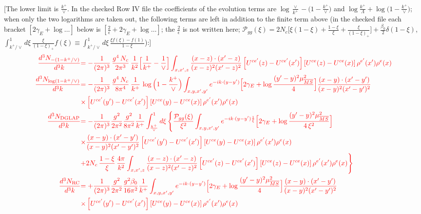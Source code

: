 \documentclass[9pt]{article}
\numberwithin{equation}{section}
\begin{document}
\begin{align}
\end{align} {\color{red}[The lower limit is $\frac{k^{+}}{\vee}$. In the checked Row IV file the coefficients of the evolution terms are $\log\frac{\vee}{k^{+}}-\big(1-\frac{k^{+}}{\vee}\big)$ and $\log\frac{k^{+}}{\Lambda}+\log\big(1-\frac{k^{+}}{\vee}\big)$; when only the two logarithms are taken out, the following terms are left in addition to the finite term above (in the checked file each bracket $[2\gamma_{E}+\log\dots]$ below is $[\frac{2}{\epsilon}+2\gamma_{E}+\log\dots]$; the $\frac{2}{\epsilon}$ is not written here; $\mathcal P_{gg}(\xi)=2N_{c}\big[\xi(1-\xi)+\frac{1-\xi}{\xi}+\frac{\xi}{(1-\xi)_{+}}\big]+\frac{\beta_{0}}{2}\delta(1-\xi)$, $\int_{k^{+}/\vee}^{1}d\xi\,\frac{\xi}{(1-\xi)_{+}}f(\xi)\equiv\int_{k^{+}/\vee}^{1}d\xi\,\frac{\xi f(\xi)-f(1)}{1-\xi}$):]} \begin{align} {\color{red}\frac{d^{3}N_{-(1-k^{+}/\vee)}}{d^{3}k}} & {\color{red}= -\frac{1}{(2\pi)^{3}}\,\frac{g^{4}\,N_{c}}{2\pi^{3}}\,\frac{1}{k^{2}}\Big[\frac{1}{k^{+}}-\frac{1}{\vee}\Big]\int_{x,x',z}\frac{(x-z)\cdot(x'-z)}{(x-z)^{2}(x'-z)^{2}}\left[U^{ce'}(z) - U^{ce'}(x')\right]\left[U^{ce}(z) - U^{ce}(x)\right]\rho^{e'}(x')\rho^{e}(x)}\notag \\ {\color{red}\frac{d^{3}N_{\log(1-k^{+}/\vee)}}{d^{3}k}} & {\color{red}= -\frac{1}{(2\pi)^{3}}\,\frac{g^{4}\,N_{c}}{8\pi^{4}}\,\frac{1}{k^{+}}\,\log\Big(1-\frac{k^{+}}{\vee}\Big)\int_{x,y,x',y'}e^{-ik\cdot(y-y')}\Big[2\gamma_{E}+\log\frac{(y'-y)^{2}\mu^{2}_{\overline{MS}}}{4}\Big]\frac{(x-y)\cdot(x'-y')}{(x-y)^{2}(x'-y')^{2}}}\notag \\ & {\color{red}\times\left[U^{ce'}(y') - U^{ce'}(x')\right]\left[U^{ce}(y) - U^{ce}(x)\right]\rho^{e'}(x')\rho^{e}(x)}\notag \\ {\color{red}\frac{d^{3}N_{\rm DGLAP}}{d^{3}k}} & {\color{red}= -\frac{1}{(2\pi)^{3}}\frac{g^{2}}{2\pi^{2}}\frac{g^{2}}{8\pi^{2}}\frac{1}{k^{+}}\int_{\frac{k^{+}}{\vee}}^{1}d\xi\,\Bigg\{\frac{\mathcal P_{gg}(\xi)}{\xi^{2}}\int_{x,y,x',y'}e^{-ik\cdot(y-y')\frac{1}{\xi}}\Big[2\gamma_{E}+\log\frac{(y'-y)^{2}\mu^{2}_{\overline{MS}}}{4\,\xi^{2}}\Big]}\notag \\ & {\color{red}\times\frac{(x-y)\cdot(x'-y')}{(x-y)^{2}(x'-y')^{2}}\left[U^{ce'}(y') - U^{ce'}(x')\right]\left[U^{ce}(y) - U^{ce}(x)\right]\rho^{e'}(x')\rho^{e}(x)}\notag \\ & {\color{red}+2N_{c}\,\frac{1-\xi}{\xi}\,\frac{4\pi}{k^{2}}\int_{x,x',z}\frac{(x-z)\cdot(x'-z)}{(x-z)^{2}(x'-z)^{2}}\left[U^{ce'}(z) - U^{ce'}(x')\right]\left[U^{ce}(z) - U^{ce}(x)\right]\rho^{e'}(x')\rho^{e}(x)\Bigg\}}\notag \\ {\color{red}\frac{d^{3}N_{\rm RC}}{d^{3}k}} & {\color{red}= +\frac{1}{(2\pi)^{3}}\frac{g^{2}}{2\pi^{2}}\frac{g^{2}\beta_{0}}{16\pi^{2}}\frac{1}{k^{+}}\int_{x,y,x',y'}e^{-ik\cdot(y-y')}\Big[2\gamma_{E}+\log\frac{(y'-y)^{2}\mu^{2}_{\overline{MS}}}{4}\Big]\frac{(x-y)\cdot(x'-y')}{(x-y)^{2}(x'-y')^{2}}}\notag \\ & {\color{red}\times\left[U^{ce'}(y') - U^{ce'}(x')\right]\left[U^{ce}(y) - U^{ce}(x)\right]\rho^{e'}(x')\rho^{e}(x)} \end{align}
\end{document}
